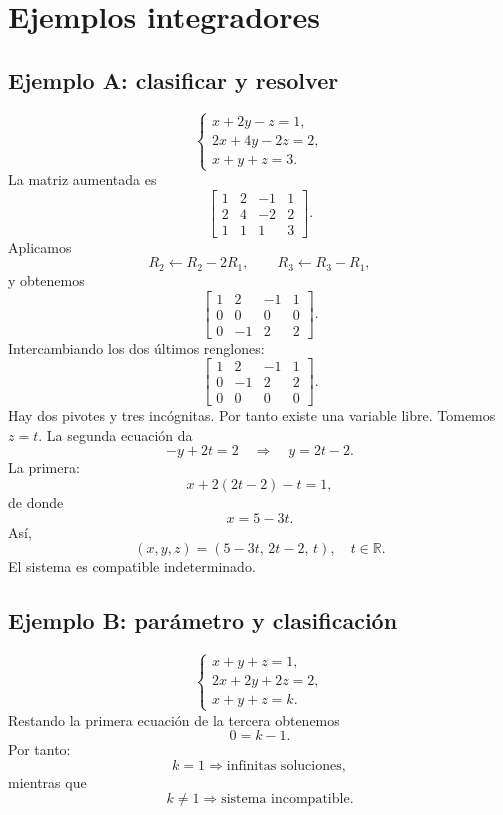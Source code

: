 \documentclass[12pt]{article}
\theoremstyle{remark}
\newcommand{\R}{\mathbb{R}}
\begin{document}
\section{Ejemplos integradores}

\subsection*{Ejemplo A: clasificar y resolver}

\[
\begin{cases}
x+2y-z=1,\\
2x+4y-2z=2,\\
x+y+z=3.
\end{cases}
\]
La matriz aumentada es
\[
\left[
\begin{array}{ccc|c}
1&2&-1&1\\
2&4&-2&2\\
1&1&1&3
\end{array}
\right].
\]
Aplicamos
\[
R_2\leftarrow R_2-2R_1,\qquad
R_3\leftarrow R_3-R_1,
\]
y obtenemos
\[
\left[
\begin{array}{ccc|c}
1&2&-1&1\\
0&0&0&0\\
0&-1&2&2
\end{array}
\right].
\]
Intercambiando los dos últimos renglones:
\[
\left[
\begin{array}{ccc|c}
1&2&-1&1\\
0&-1&2&2\\
0&0&0&0
\end{array}
\right].
\]
Hay dos pivotes y tres incógnitas. Por tanto existe una variable libre. Tomemos $z=t$. La segunda
ecuación da
\[
-y+2t=2\quad\Longrightarrow\quad y=2t-2.
\]
La primera:
\[
x+2(2t-2)-t=1,
\]
de donde
\[
x=5-3t.
\]
Así,
\[
\boxed{(x,y,z)=(5-3t,\,2t-2,\,t),\quad t\in\R.}
\]
El sistema es compatible indeterminado.

\subsection*{Ejemplo B: parámetro y clasificación}

\[
\begin{cases}
x+y+z=1,\\
2x+2y+2z=2,\\
x+y+z=k.
\end{cases}
\]
Restando la primera ecuación de la tercera obtenemos
\[
0=k-1.
\]
Por tanto:
\[
k=1\Longrightarrow\text{infinitas soluciones},
\]
mientras que
\[
k\neq1\Longrightarrow\text{sistema incompatible}.
\]
\end{document}
